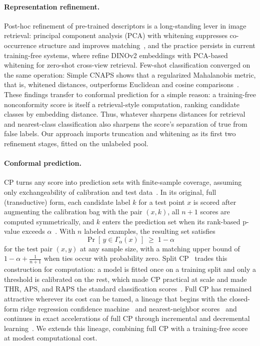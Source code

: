\paragraph{Representation refinement.}
Post-hoc refinement of pre-trained descriptors is a long-standing lever
in image retrieval: principal component analysis (PCA) with whitening suppresses co-occurrence
structure and improves matching~\citep{jegou2012negative}, and the
practice persists in current training-free systems, where
\citet{min2026street} refine DINOv2 embeddings with PCA-based whitening
for zero-shot cross-view retrieval. Few-shot classification converged on
the same operation: Simple CNAPS shows that a regularized Mahalanobis
metric, that is, whitened distances, outperforms Euclidean and cosine
comparisons~\citep{bateni2020improved}. These findings transfer to
conformal prediction for a simple reason: a training-free nonconformity
score is itself a retrieval-style computation, ranking candidate classes
by embedding distance. Thus, whatever sharpens distances for retrieval and
nearest-class classification also sharpens the score's separation of
true from false labels. Our approach imports truncation and whitening as its
first two refinement stages, fitted on the unlabeled pool.

\paragraph{Conformal prediction.}
CP turns any score into prediction sets with finite-sample coverage,
assuming only exchangeability of calibration and test
data~\citep{vovk2005algorithmic, angelopoulos2023gentle}. In its
original, full (transductive) form, each candidate label $k$ for a test
point $x$ is scored after augmenting the calibration bag with the pair
$(x, k)$, all $n{+}1$ scores are computed symmetrically, and $k$ enters
the prediction set when its rank-based p-value exceeds
$\alpha$~\citep{vovk2005algorithmic}. With $n$ labeled examples, the
resulting set satisfies
\begin{equation}
\label{eq:coverage}
\Pr\!\left[\, y \in \Gamma_\alpha(x) \,\right] \;\ge\; 1 - \alpha
\end{equation}
for the test pair $(x, y)$ at any sample size, with a matching upper
bound of $1 - \alpha + \tfrac{1}{n+1}$ when ties occur with probability
zero. Split
CP~\citep{papadopoulos2002inductive, lei2018distribution} trades this
construction for computation: a model is fitted once on a training split
and only a threshold is calibrated on the rest, which made CP practical
at scale and made THR, APS, and RAPS the standard classification
scores~\citep{sadinle2019least, romano2020aps, angelopoulos2021raps}.
Full CP has remained attractive wherever its cost can be tamed, a
lineage that begins with the closed-form ridge regression confidence
machine~\citep{nouretdinov2001ridge} and nearest-neighbor
scores~\citep{vovk2005algorithmic} and continues in exact accelerations
of full CP through incremental and decremental
learning~\citep{cherubin2021exact}. We extends this lineage, combining full CP with a training-free score at modest computational cost.

